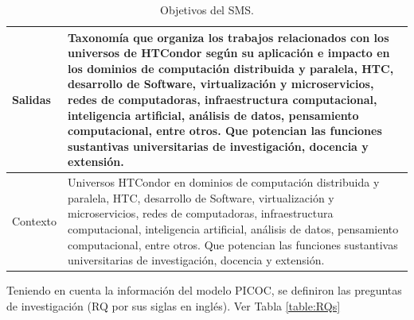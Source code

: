 \begin{table}[htbp]
\begin{tabular}{|>{\arraybackslash}m{1.7cm}|>{\arraybackslash}m{6.3cm}|}
		\hline
		Salidas             & Taxonomía que organiza los trabajos relacionados con los universos de HTCondor según su aplicación e impacto en los dominios de computación distribuida y paralela, HTC, desarrollo de Software, virtualización y microservicios, redes de computadoras, infraestructura computacional, inteligencia artificial, análisis de datos, pensamiento computacional, entre otros. Que potencian las funciones sustantivas universitarias de investigación, docencia y extensión.                       \\

		\hline
		Contexto            & Universos HTCondor en dominios de computación distribuida y paralela, HTC, desarrollo de Software, virtualización y microservicios, redes de computadoras, infraestructura computacional, inteligencia artificial, análisis de datos, pensamiento computacional, entre otros. Que potencian las funciones sustantivas universitarias de investigación, docencia y extensión.                                                                                                                     \\
		\hline
	\end{tabular}
	\vspace{6pt}  %
	\caption{Objetivos del SMS.}
	\label{table:PICOC}

\end{table}

Teniendo en cuenta la información del modelo PICOC, se definiron las preguntas de investigación (RQ por sus siglas en inglés). Ver Tabla \ref{table:RQs}

